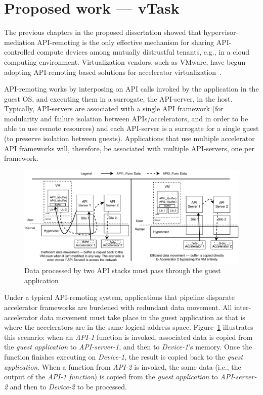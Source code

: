 \section{Proposed work --- vTask}
\label{sec:vTask}

The previous chapters in the proposed dissertation showed that
hypervisor-mediation API-remoting is the only effective mechanism for sharing
API-controlled compute devices among mutually distrustful tenants, e.g., in a
cloud computing environment. Virtualization vendors, such as VMware, have
begun adopting API-remoting based solutions for accelerator virtualization~\cite{bitfusion-acquisition}.

API-remoting works by interposing on API calls invoked by the application in
the guest OS, and executing them in a surrogate, the API-server, in the host.
Typically, API-servers are associated with a single API framework (for
modularity and failure isolation between APIs/accelerators, and in order to be
able to use remote resources) and each API-server is a surrogate for a single
guest (to preserve isolation between guests). Applications that use multiple
accelerator API frameworks will, therefore, be associated with multiple
API-servers, one per framework.

\begin{figure}[ht!]
\centering
\captionsetup{justification=centering,width=\linewidth}
\includegraphics[width=\linewidth]{figures/vtask-overview.pdf}
\caption{Data processed by two API stacks must pass through the guest application}
\label{fig:overview}
\end{figure}

Under a typical API-remoting system, applications that pipeline disparate
accelerator frameworks are burdened with redundant data movement. All
inter-accelerator data movement must take place in the guest application as
that is where the accelerators are in the same logical address space.
Figure~\ref{fig:overview} illustrates this scenario: when an \emph{API-1}
function is invoked, associated data is copied from the
\emph{guest application} to \emph{API-server-1}, and then to \emph{Device-1}’s
memory. Once the function finishes executing on \emph{Device-1}, the result is
copied back to the \emph{guest application}. When a function from \emph{API-2}
is invoked, the same data (i.e., the output of the \emph{API-1 function}) is
copied from the \emph{guest application} to \emph{API-server-2} and then to
\emph{Device-2} to be processed.

